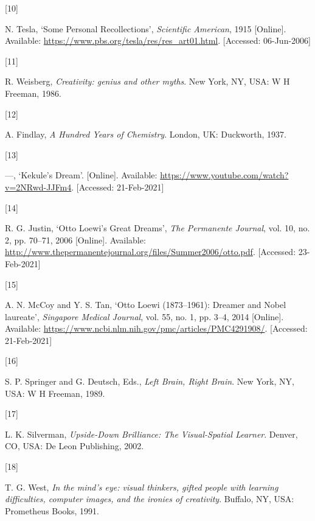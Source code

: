 \documentclass[
  12pt,
  british,
  a4paper,
  rgb,
  dvipsnames,
  svgnames,
  hyphens]{article}
\newlength{\cslhangindent}
\newlength{\csllabelwidth}
\newenvironment{CSLReferences}[2] %
 {%
  \setlength{\parindent}{0pt}
  \ifodd #1 \everypar{\setlength{\hangindent}{\cslhangindent}}\ignorespaces\fi
  \ifnum #2 > 0
  \setlength{\parskip}{#2\baselineskip}
  \fi
 }%
 {}
\newcommand{\CSLLeftMargin}[1]{\parbox[t]{\csllabelwidth}{#1}}
\newcommand{\CSLRightInline}[1]{\parbox[t]{\linewidth - \csllabelwidth}{#1}\break}
\begin{document}
\begin{CSLReferences}{0}{0}
\leavevmode{}%
\CSLLeftMargin{{[}10{]} }
\CSLRightInline{N. Tesla, {`{Some Personal Recollections}'},
\emph{Scientific American}, 1915 {[}Online{]}. Available:
\url{https://www.pbs.org/tesla/res/res_art01.html}. {[}Accessed:
06-Jun-2006{]}}

\leavevmode{}%
\CSLLeftMargin{{[}11{]} }
\CSLRightInline{R. Weisberg, \emph{{Creativity: genius and other
myths}}. New York, NY, USA: W H Freeman, 1986. }

\leavevmode{}%
\CSLLeftMargin{{[}12{]} }
\CSLRightInline{A. Findlay, \emph{{A Hundred Years of Chemistry}}.
London, UK: Duckworth, 1937. }

\leavevmode{}%
\CSLLeftMargin{{[}13{]} }
\CSLRightInline{---, {`{Kekule's Dream}'}. {[}Online{]}. Available:
\url{https://www.youtube.com/watch?v=2NRwd-JJFm4}. {[}Accessed:
21-Feb-2021{]}}

\leavevmode{}%
\CSLLeftMargin{{[}14{]} }
\CSLRightInline{R. G. Justin, {`{Otto Loewi's Great Dreams}'}, \emph{The
Permanente Journal}, vol. 10, no. 2, pp. 70--71, 2006 {[}Online{]}.
Available:
\url{http://www.thepermanentejournal.org/files/Summer2006/otto.pdf}.
{[}Accessed: 23-Feb-2021{]}}

\leavevmode{}%
\CSLLeftMargin{{[}15{]} }
\CSLRightInline{A. N. McCoy and Y. S. Tan, {`{Otto Loewi (1873--1961):
Dreamer and Nobel laureate}'}, \emph{Singapore Medical Journal}, vol.
55, no. 1, pp. 3--4, 2014 {[}Online{]}. Available:
\url{https://www.ncbi.nlm.nih.gov/pmc/articles/PMC4291908/}.
{[}Accessed: 21-Feb-2021{]}}

\leavevmode{}%
\CSLLeftMargin{{[}16{]} }
\CSLRightInline{S. P. Springer and G. Deutsch, Eds., \emph{{Left Brain,
Right Brain}}. New York, NY, USA: W H Freeman, 1989. }

\leavevmode{}%
\CSLLeftMargin{{[}17{]} }
\CSLRightInline{L. K. Silverman, \emph{{Upside-Down Brilliance: The
Visual-Spatial Learner}}. Denver, CO, USA: De Leon Publishing, 2002. }

\leavevmode{}%
\CSLLeftMargin{{[}18{]} }
\CSLRightInline{T. G. West, \emph{{In the mind's eye: visual thinkers,
gifted people with learning difficulties, computer images, and the
ironies of creativity}}. Buffalo, NY, USA: Prometheus Books, 1991. }


\end{CSLReferences}
\end{document}
